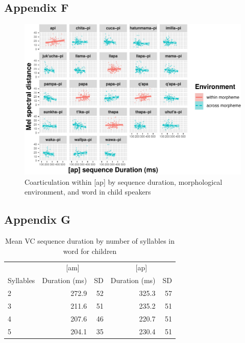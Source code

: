 \documentclass[
]{article}
\begin{document}
\hypertarget{appendix-f}{%
\subsection{Appendix F}\label{appendix-f}}

\begin{figure}
\centering
\includegraphics{3_ch3_results_files/figure-latex/child-facet-ap-word-1.pdf}
\caption{\label{fig:child-facet-ap-word}Coarticulation within {[}ap{]} by sequence duration, morphological environment, and word in child speakers}
\end{figure}

\hypertarget{appendix-g}{%
\subsection{Appendix G}\label{appendix-g}}

\begin{table}

\caption{\label{tab:dur-by-syll-kids}Mean VC sequence duration by number of syllables in word for children}
\centering
\begin{tabular}[t]{lrrrr}
\toprule
\multicolumn{1}{c}{ } & \multicolumn{2}{c}{[am]} & \multicolumn{2}{c}{[ap]} \\
\cmidrule(l{3pt}r{3pt}){2-3} \cmidrule(l{3pt}r{3pt}){4-5}
Syllables & Duration (ms) & SD  & Duration (ms) & SD\\
\midrule
2 & 272.9 & 52 & 325.3 & 57\\
3 & 211.6 & 51 & 235.2 & 51\\
4 & 207.6 & 46 & 220.7 & 51\\
5 & 204.1 & 35 & 230.4 & 51\\
\bottomrule
\end{tabular}
\end{table}
\end{document}
